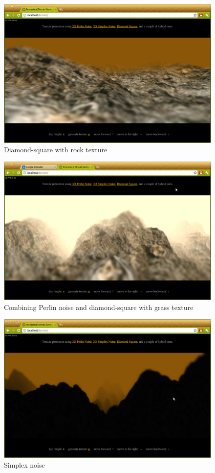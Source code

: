 \begin{figure}
	\center
	\includegraphics[scale=0.4]{images/demo_1_3.png}
	\caption{Diamond-square with rock texture}
	\label{fig:demo_1_3}
\end{figure}
\begin{figure}
	\center
	\includegraphics[scale=0.4]{images/demo_2_1.png}
	\caption{Combining Perlin noise and diamond-square with grass texture}
	\label{fig:demo_2_1}
\end{figure}
\begin{figure}
	\center
	\includegraphics[scale=0.4]{images/demo_3_0.png}
	\caption{Simplex noise}
	\label{fig:demo_3_0}
\end{figure}
